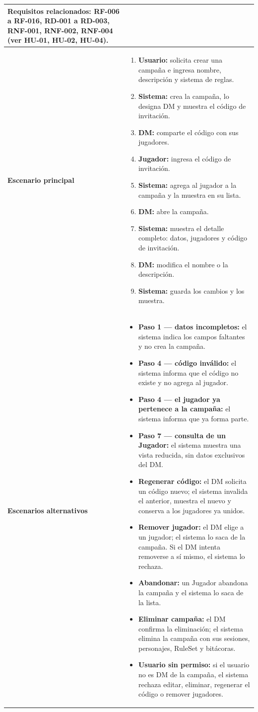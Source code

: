 {\begin{longtable}{|>{\raggedright\arraybackslash\bfseries}p{3.2cm}|>{\raggedright\arraybackslash}p{11.9cm}|}
Requisitos relacionados: RF-006 a RF-016, RD-001 a RD-003, RNF-001, RNF-002, RNF-004 (ver HU-01, HU-02, HU-04). \\ \hline
Escenario principal & \begin{enumerate}[itemsep=2pt,topsep=2pt]
\item \textbf{Usuario:} solicita crear una campaña e ingresa nombre, descripción y sistema de reglas.
\item \textbf{Sistema:} crea la campaña, lo designa DM y muestra el código de invitación.
\item \textbf{DM:} comparte el código con sus jugadores.
\item \textbf{Jugador:} ingresa el código de invitación.
\item \textbf{Sistema:} agrega al jugador a la campaña y la muestra en su lista.
\item \textbf{DM:} abre la campaña.
\item \textbf{Sistema:} muestra el detalle completo: datos, jugadores y código de invitación.
\item \textbf{DM:} modifica el nombre o la descripción.
\item \textbf{Sistema:} guarda los cambios y los muestra.
\end{enumerate} \\ \hline
Escenarios alternativos & \begin{itemize}[itemsep=2pt,topsep=2pt]
\item \textbf{Paso 1 — datos incompletos:} el sistema indica los campos faltantes y no crea la campaña.
\item \textbf{Paso 4 — código inválido:} el sistema informa que el código no existe y no agrega al jugador.
\item \textbf{Paso 4 — el jugador ya pertenece a la campaña:} el sistema informa que ya forma parte.
\item \textbf{Paso 7 — consulta de un Jugador:} el sistema muestra una vista reducida, sin datos exclusivos del DM.
\item \textbf{Regenerar código:} el DM solicita un código nuevo; el sistema invalida el anterior, muestra el nuevo y conserva a los jugadores ya unidos.
\item \textbf{Remover jugador:} el DM elige a un jugador; el sistema lo saca de la campaña. Si el DM intenta removerse a sí mismo, el sistema lo rechaza.
\item \textbf{Abandonar:} un Jugador abandona la campaña y el sistema lo saca de la lista.
\item \textbf{Eliminar campaña:} el DM confirma la eliminación; el sistema elimina la campaña con sus sesiones, personajes, RuleSet y bitácoras.
\item \textbf{Usuario sin permiso:} si el usuario no es DM de la campaña, el sistema rechaza editar, eliminar, regenerar el código o remover jugadores.
\end{itemize} \\ \hline
\end{longtable}}
